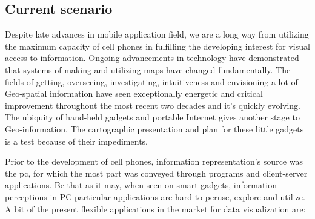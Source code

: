 \subsection{Current scenario}

Despite late advances in mobile application field, we are a long way from utilizing the maximum capacity of cell phones in fulfilling the developing interest for visual access to information. Ongoing advancements in technology have demonstrated that systems of making and utilizing maps have changed fundamentally. The fields of getting, overseeing, investigating, intuitiveness and envisioning a lot of Geo-spatial information have seen exceptionally energetic and critical improvement throughout the most recent two decades and it's quickly evolving. The ubiquity of hand-held gadgets and portable Internet gives another stage to Geo-information. The cartographic presentation and plan for these little gadgets is a test because of their impediments.

Prior to the development of cell phones, information representation's source was the \gls{pc}, for which the most part was conveyed through programs and client-server applications. Be that as it may, when seen on smart gadgets, information perceptions in PC-particular applications are hard to peruse, explore and utilize. A bit of the present flexible applications in the market for data visualization are:

